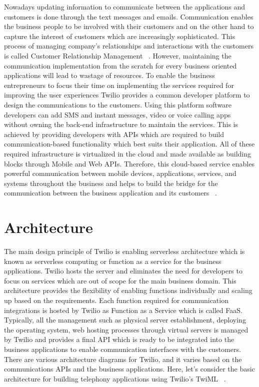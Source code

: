 Nowadays updating information to communicate between the applications and 
customers is done through the text messages and emails. Communication enables 
the business people to be involved with their customers and on the other hand
to capture the interest of customers which are increasingly sophisticated. 
This process of managing company’s relationships and interactions with the 
customers is called Customer Relationship Management
~\cite{hid-sp18-406-twilio-intro1}. However, maintaining the communication 
implementation from the scratch for every business oriented applications will 
lead to wastage of resources. To enable the business entrepreneurs to focus 
their time on implementing the services required for improving the user 
experiences Twilio provides a common developer platform to design the 
communications to the customers. Using this platform software developers can add
SMS and instant messages, video or voice calling apps without owning the 
back-end infrastructure to maintain the services. This is achieved by providing
developers with APIs which are required to build communication-based 
functionality which best suits their application.  All of these required 
infrastructure is virtualized in the cloud and made available as building 
blocks through Mobile and Web APIs. Therefore, this cloud-based service enables
powerful communication between mobile devices, applications, services, and 
systems throughout the business and helps to build the bridge for the 
communication between the business application and its customers
~\cite{hid-sp18-406-twilio-intro2}. 

\section{Architecture}

The main design principle of Twilio is enabling serverless architecture which is
known as serverless computing or function as a service for the business 
applications. Twilio hosts the server and eliminates the need for developers to 
focus on services which are out of scope for the main business domain. This 
architecture provides the flexibility of enabling functions individually and 
scaling up based on the requirements. Each function required for communication 
integrations is hosted by Twilio as Function as a Service which is called FaaS. 
Typically, all the management such as physical server establishment, deploying 
the operating system, web hosting processes through virtual servers is managed 
by Twilio and provides a final API which is ready to be integrated into the 
business applications to enable communication interfaces with the customers. 
There are various architecture diagrams for Twilio, and it varies based on the 
communications APIs and the business applications. Here, let's consider the 
basic architecture for building telephony applications using Twilio’s TwiML
~\cite{hid-sp18-406-twilio-architecture1}.

